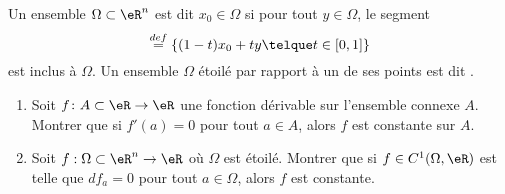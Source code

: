 
\begin{exercice}\label{exoTP20090001}


Un ensemble $\Omega\subset\eR^n$ est dit  $x_0\in\Omega$ si pour tout $y \in \Omega$, le segment
\begin{equation*}
	[x_0, y] \stackrel{def}{=} \{ (1-t) x_0 + t y \telque t \in  [0,1] \}
\end{equation*}
est inclus à $\Omega$. Un ensemble $\Omega$ étoilé par rapport à un de ses points est dit .

\begin{enumerate}
\item
Soit $f\colon A\subset \eR\to\eR$ une fonction dérivable sur l'ensemble connexe $A$. Montrer que si $f'(a)=0$ pour tout $a\in A$, alors $f$ est constante sur $A$.

\item
Soit $f : \Omega \subset \eR^n \to \eR$ où $\Omega$ est étoilé. Montrer que si $f \in C^1(\Omega,{\eR})$ est telle que $df_a = 0$ pour tout $a \in \Omega$, alors $f$ est constante.

\end{enumerate}

\end{exercice}

